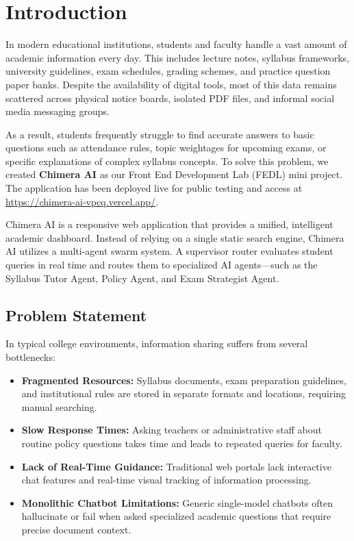 \chapter{Introduction}

In modern educational institutions, students and faculty handle a vast amount of academic information every day. This includes lecture notes, syllabus frameworks, university guidelines, exam schedules, grading schemes, and practice question paper banks. Despite the availability of digital tools, most of this data remains scattered across physical notice boards, isolated PDF files, and informal social media messaging groups.

As a result, students frequently struggle to find accurate answers to basic questions such as attendance rules, topic weightages for upcoming exams, or specific explanations of complex syllabus concepts. To solve this problem, we created \textbf{Chimera AI} as our Front End Development Lab (FEDL) mini project. The application has been deployed live for public testing and access at \url{https://chimera-ai-vpcq.vercel.app/}.

Chimera AI is a responsive web application that provides a unified, intelligent academic dashboard. Instead of relying on a single static search engine, Chimera AI utilizes a multi-agent swarm system. A supervisor router evaluates student queries in real time and routes them to specialized AI agents---such as the Syllabus Tutor Agent, Policy Agent, and Exam Strategist Agent.

\section{Problem Statement}
In typical college environments, information sharing suffers from several bottlenecks:
\begin{itemize}
    \item \textbf{Fragmented Resources:} Syllabus documents, exam preparation guidelines, and institutional rules are stored in separate formats and locations, requiring manual searching.
    \item \textbf{Slow Response Times:} Asking teachers or administrative staff about routine policy questions takes time and leads to repeated queries for faculty.
    \item \textbf{Lack of Real-Time Guidance:} Traditional web portals lack interactive chat features and real-time visual tracking of information processing.
    \item \textbf{Monolithic Chatbot Limitations:} Generic single-model chatbots often hallucinate or fail when asked specialized academic questions that require precise document context.
\end{itemize}

